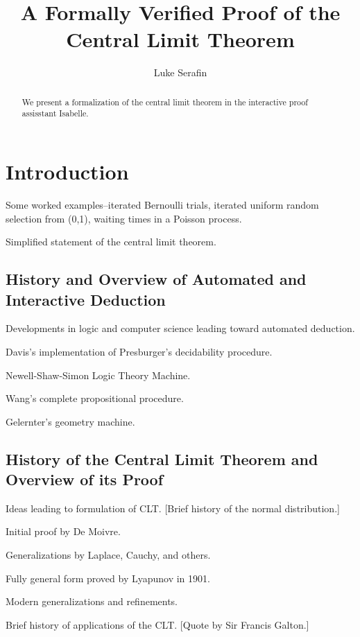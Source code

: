 \documentclass{amsart}
\title{A Formally Verified Proof of the Central Limit Theorem}
\author{Luke Serafin}
\theoremstyle{definition}
\theoremstyle{remark}
\begin{document}
\begin{abstract}
We present a formalization of the central limit theorem in the interactive proof assisstant Isabelle.
\end{abstract}

\maketitle

\section{Introduction}

Some worked examples--iterated Bernoulli trials, iterated uniform random selection from (0,1), waiting times in a Poisson process.

Simplified statement of the central limit theorem.

\subsection{History and Overview of Automated and Interactive Deduction}

Developments in logic and computer science leading toward automated deduction.

Davis's implementation of Presburger's decidability procedure.

Newell-Shaw-Simon Logic Theory Machine.

Wang's complete propositional procedure.

Gelernter's geometry machine.

\subsection{History of the Central Limit Theorem and Overview of its Proof}


Ideas leading to formulation of CLT. [Brief history of the normal distribution.]

Initial proof by De Moivre.

Generalizations by Laplace, Cauchy, and others.

Fully general form proved by Lyapunov in 1901.

Modern generalizations and refinements.

Brief history of applications of the CLT. [Quote by Sir Francis Galton.]

\end{document}
